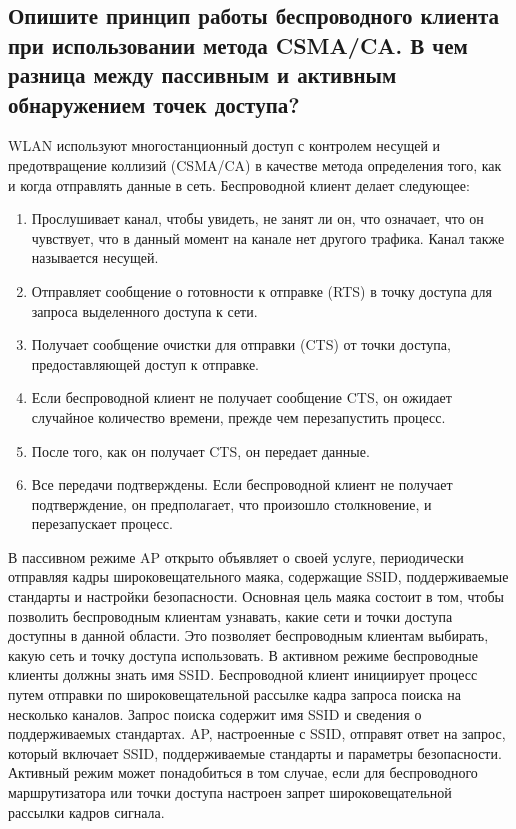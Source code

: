 \subsection{Опишите принцип работы беспроводного клиента при 
использовании метода CSMA/CA. В чем разница между 
пассивным и активным обнаружением точек доступа?}

WLAN используют многостанционный доступ с контролем несущей и 
предотвращение коллизий (CSMA/CA) в качестве метода определения того, 
как и когда отправлять данные в сеть. Беспроводной клиент делает 
следующее:

\begin{enumerate}
	\item Прослушивает канал, чтобы увидеть, не занят ли он, что 
		означает, что он чувствует, что в данный момент на канале нет 
		другого трафика. Канал также называется несущей.
	\item Отправляет сообщение о готовности к отправке (RTS) в точку 
		доступа для запроса выделенного доступа к сети.
	\item Получает сообщение очистки для отправки (CTS) от точки 
		доступа, предоставляющей доступ к отправке.
	\item Если беспроводной клиент не получает сообщение CTS, он 
		ожидает случайное количество времени, прежде чем перезапустить 
		процесс.
	\item После того, как он получает CTS, он передает данные.
	\item Все передачи подтверждены. Если беспроводной клиент не 
		получает подтверждение, он предполагает, что произошло 
		столкновение, и перезапускает процесс.
\end{enumerate}

В пассивном режиме AP открыто объявляет о своей услуге, 
периодически отправляя кадры широковещательного маяка, содержащие 
SSID, поддерживаемые стандарты и настройки безопасности. Основная цель 
маяка состоит в том, чтобы позволить беспроводным клиентам узнавать, 
какие сети и точки доступа доступны в данной области. Это позволяет 
беспроводным клиентам выбирать, какую сеть и точку доступа использовать.
В активном режиме беспроводные клиенты должны знать имя SSID. 
Беспроводной клиент инициирует процесс путем отправки по 
широковещательной рассылке кадра запроса поиска на несколько каналов. 
Запрос поиска содержит имя SSID и сведения о поддерживаемых стандартах. 
AP, настроенные с SSID, отправят ответ на запрос, который включает SSID, 
поддерживаемые стандарты и параметры безопасности. Активный режим 
может понадобиться в том случае, если для беспроводного маршрутизатора 
или точки доступа настроен запрет широковещательной рассылки кадров 
сигнала.

